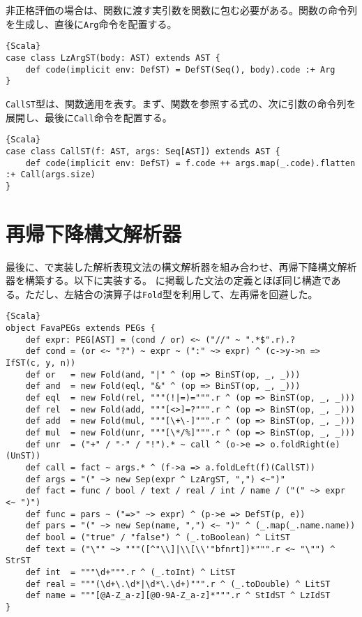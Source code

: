 \documentclass[10pt,a4paper]{book}
\begin{document}
非正格評価の場合は、関数に渡す実引数を関数に包む必要がある。関数の命令列を生成し、直後に\texttt{Arg}命令を配置する。

\begin{Verbatim}{Scala}
case class LzArgST(body: AST) extends AST {
	def code(implicit env: DefST) = DefST(Seq(), body).code :+ Arg
}
\end{Verbatim}

\texttt{CallST}型は、関数適用を表す。まず、関数を参照する式の、次に引数の命令列を展開し、最後に\texttt{Call}命令を配置する。

\begin{Verbatim}{Scala}
case class CallST(f: AST, args: Seq[AST]) extends AST {
	def code(implicit env: DefST) = f.code ++ args.map(_.code).flatten :+ Call(args.size)
}
\end{Verbatim}

\section{再帰下降構文解析器}

最後に、で実装した解析表現文法の構文解析器を組み合わせ、再帰下降構文解析器を構築する。以下に実装する。
に掲載した文法の定義とほぼ同じ構造である。ただし、左結合の演算子は\texttt{Fold}型を利用して、左再帰を回避した。

\begin{Verbatim}{Scala}
object FavaPEGs extends PEGs {
	def expr: PEG[AST] = (cond / or) <~ ("//" ~ ".*$".r).?
	def cond = (or <~ "?") ~ expr ~ (":" ~> expr) ^ (c->y->n => IfST(c, y, n))
	def or   = new Fold(and, "|" ^ (op => BinST(op, _, _)))
	def and  = new Fold(eql, "&" ^ (op => BinST(op, _, _)))
	def eql  = new Fold(rel, """(!|=)=""".r ^ (op => BinST(op, _, _)))
	def rel  = new Fold(add, """[<>]=?""".r ^ (op => BinST(op, _, _)))
	def add  = new Fold(mul, """[\+\-]""".r ^ (op => BinST(op, _, _)))
	def mul  = new Fold(unr, """[\*/%]""".r ^ (op => BinST(op, _, _)))
	def unr  = ("+" / "-" / "!").* ~ call ^ (o->e => o.foldRight(e)(UnST))
	def call = fact ~ args.* ^ (f->a => a.foldLeft(f)(CallST))
	def args = "(" ~> new Sep(expr ^ LzArgST, ",") <~")"
	def fact = func / bool / text / real / int / name / ("(" ~> expr <~ ")")
	def func = pars ~ ("=>" ~> expr) ^ (p->e => DefST(p, e))
	def pars = "(" ~> new Sep(name, ",") <~ ")" ^ (_.map(_.name.name))
	def bool = ("true" / "false") ^ (_.toBoolean) ^ LitST
	def text = ("\"" ~> """([^"\\]|\\[\\'"bfnrt])*""".r <~ "\"") ^ StrST
	def int  = """\d+""".r ^ (_.toInt) ^ LitST
	def real = """(\d+\.\d*|\d*\.\d+)""".r ^ (_.toDouble) ^ LitST
	def name = """[@A-Z_a-z][@0-9A-Z_a-z]*""".r ^ StIdST ^ LzIdST
}
\end{Verbatim}
\end{document}
